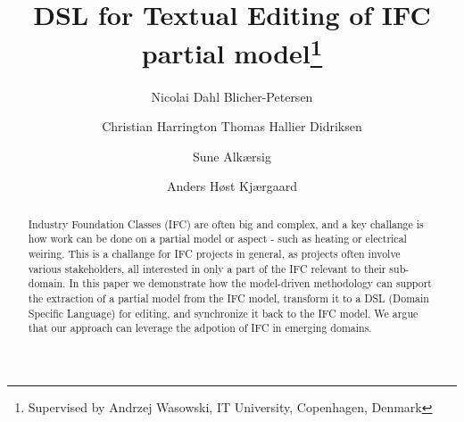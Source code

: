 \documentclass{llncs}
\begin{document}

\mainmatter              %
\title{DSL for Textual Editing of IFC partial model\thanks{Supervised by Andrzej Wasowski, IT University, Copenhagen, Denmark}}

\author{Nicolai Dahl Blicher-Petersen \and Christian Harrington
Thomas Hallier Didriksen \and Sune Alkærsig \and Anders Høst Kjærgaard}


\maketitle              %

\begin{abstract}
Industry Foundation Classes (IFC) are often big and complex, and a key challange is how work can be done on a partial model or aspect - such as heating or electrical weiring. This is a challange for IFC projects in general, as projects often involve various stakeholders, all interested in only a part of the IFC relevant to their sub-domain. In this paper we demonstrate how the model-driven methodology can support the extraction of a partial model from the IFC model, transform it to a DSL (Domain Specific Language) for editing, and synchronize it back to the IFC model. We argue that our approach can leverage the adpotion of IFC in emerging domains.


\end{abstract}
\end{document}
